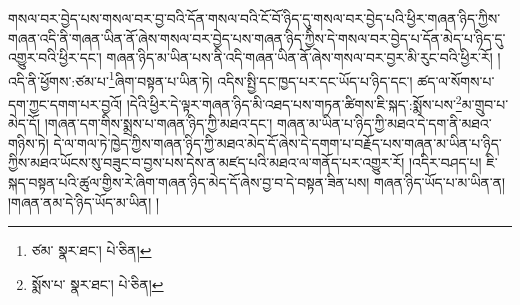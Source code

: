 གསལ་བར་བྱེད་པས་གསལ་བར་བྱ་བའི་དོན་གསལ་བའི་ངོ་བོ་ཉིད་དུ་གསལ་བར་བྱེད་པའི་ཕྱིར་གཞན་ཉིད་ཀྱིས་གཞན་འདི་ནི་གཞན་ཡིན་ནོ་ཞེས་གསལ་བར་བྱེད་པས་གཞན་ཉིད་ཀྱིས་དེ་གསལ་བར་བྱེད་པ་དོན་མེད་པ་ཉིད་དུ་འགྱུར་བའི་ཕྱིར་དང་། གཞན་ཉིད་མ་ཡིན་པས་ནི་འདི་གཞན་ཡིན་ནོ་ཞེས་གསལ་བར་བྱར་མི་རུང་བའི་ཕྱིར་རོ། །འདི་ནི་ཕྱོགས་:ཙམ་པ་\footnote{ཙམ་  སྣར་ཐང་།  པེ་ཅིན། }ཞིག་བསྟན་པ་ཡིན་ཏེ། འདིས་སྤྱི་དང་ཁྱད་པར་དང་ཡོད་པ་ཉིད་དང་། ཚད་ལ་སོགས་པ་དག་ཀྱང་དགག་པར་བྱའོ། །དེའི་ཕྱིར་དེ་ལྟར་གཞན་ཉིད་མི་འཐད་པས་གཏན་ཚིགས་ཇི་སྐད་:སྨོས་པས་\footnote{སྨོས་པ་  སྣར་ཐང་།  པེ་ཅིན། }མ་གྲུབ་པ་མེད་དོ། །གཞན་དག་གིས་སྨྲས་པ་གཞན་ཉིད་ཀྱི་མཐའ་དང་། གཞན་མ་ཡིན་པ་ཉིད་ཀྱི་མཐའ་དེ་དག་ནི་མཐའ་གཉིས་ཏེ། དེ་ལ་གལ་ཏེ་ཁྱེད་ཀྱིས་གཞན་ཉིད་ཀྱི་མཐའ་མེད་དོ་ཞེས་དེ་དགག་པ་བརྗོད་པས་གཞན་མ་ཡིན་པ་ཉིད་ཀྱིས་མཐའ་ཡོངས་སུ་བཟུང་བ་བྱས་པས་དེས་ན་མཛད་པའི་མཐའ་ལ་གནོད་པར་འགྱུར་རོ། །འདིར་བཤད་པ། ཇི་སྐད་བསྟན་པའི་ཚུལ་གྱིས་རེ་ཞིག་གཞན་ཉིད་མེད་དོ་ཞེས་བྱ་བ་དེ་བསྟན་ཟིན་པས། གཞན་ཉིད་ཡོད་པ་མ་ཡིན་ན། །གཞན་ནམ་དེ་ཉིད་ཡོད་མ་ཡིན། །
